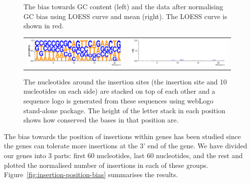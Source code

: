 \documentclass[a4paper,10pt, twocolumn]{article}
\begin{document}
\begin{figure}
\begin{tabular}{c c}
\end{tabular}
\caption{The bias towards GC content (left) and the data after normalising GC bias using LOESS curve and mean (right). The LOESS curve is shown in red.}
\label{fig:GC_bias}
\end{figure}

\begin{figure}[H]
\centering
\begin{tabular}{c c}
\includegraphics[scale=.98, angle = -90]{logos/logo-prob.pdf} &
\includegraphics[scale=.98, angle = -90]{logos/logo-bits.pdf}
\end{tabular}
\caption{The nucleotides around the insertion sites (the insertion site and 10 nucleotides on each side) are stacked on top of each other and a sequence logo is generated from these sequences using webLogo stand-alone package. The height of the letter stack in each position shows how conserved the bases in that position are.}
\label{fig:logo}
\end{figure}

The bias towards the position of insertions within genes has been studied since the genes can tolerate more insertions at the 3' end of the gene. We have divided our genes into 3 parts: first 60 nucleotides, last 60 nucleotides, and the rest and plotted the normalised number of insertions in each of these groups. Figure~\ref{fig:insertion-position-bias} summarises the results.
\end{document}
